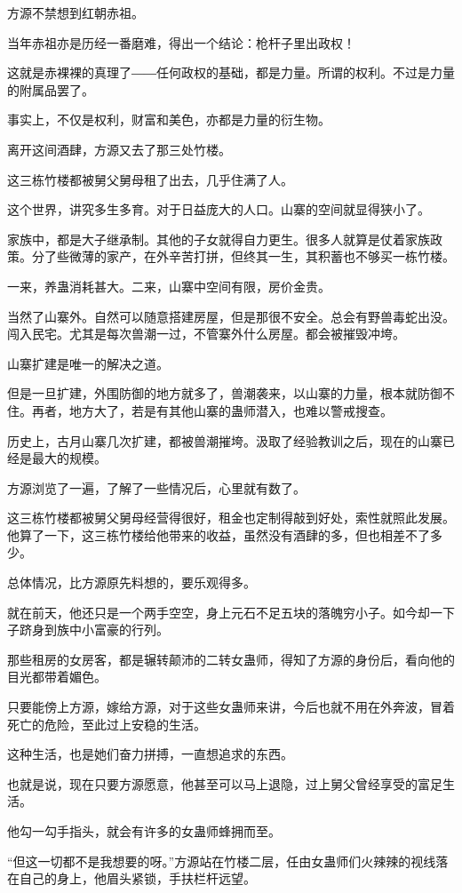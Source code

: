 \begin{this_body}
方源不禁想到红朝赤祖。

当年赤祖亦是历经一番磨难，得出一个结论：枪杆子里出政权！

这就是赤裸裸的真理了――任何政权的基础，都是力量。所谓的权利。不过是力量的附属品罢了。

事实上，不仅是权利，财富和美色，亦都是力量的衍生物。

离开这间酒肆，方源又去了那三处竹楼。

这三栋竹楼都被舅父舅母租了出去，几乎住满了人。

这个世界，讲究多生多育。对于日益庞大的人口。山寨的空间就显得狭小了。

家族中，都是大子继承制。其他的子女就得自力更生。很多人就算是仗着家族政策。分了些微薄的家产，在外辛苦打拼，但终其一生，其积蓄也不够买一栋竹楼。

一来，养蛊消耗甚大。二来，山寨中空间有限，房价金贵。

当然了山寨外。自然可以随意搭建房屋，但是那很不安全。总会有野兽毒蛇出没。闯入民宅。尤其是每次兽潮一过，不管寨外什么房屋。都会被摧毁冲垮。

山寨扩建是唯一的解决之道。

但是一旦扩建，外围防御的地方就多了，兽潮袭来，以山寨的力量，根本就防御不住。再者，地方大了，若是有其他山寨的蛊师潜入，也难以警戒搜查。

历史上，古月山寨几次扩建，都被兽潮摧垮。汲取了经验教训之后，现在的山寨已经是最大的规模。

方源浏览了一遍，了解了一些情况后，心里就有数了。

这三栋竹楼都被舅父舅母经营得很好，租金也定制得敲到好处，索性就照此发展。他算了一下，这三栋竹楼给他带来的收益，虽然没有酒肆的多，但也相差不了多少。

总体情况，比方源原先料想的，要乐观得多。

就在前天，他还只是一个两手空空，身上元石不足五块的落魄穷小子。如今却一下子跻身到族中小富豪的行列。

那些租房的女房客，都是辗转颠沛的二转女蛊师，得知了方源的身份后，看向他的目光都带着媚色。

只要能傍上方源，嫁给方源，对于这些女蛊师来讲，今后也就不用在外奔波，冒着死亡的危险，至此过上安稳的生活。

这种生活，也是她们奋力拼搏，一直想追求的东西。

也就是说，现在只要方源愿意，他甚至可以马上退隐，过上舅父曾经享受的富足生活。

他勾一勾手指头，就会有许多的女蛊师蜂拥而至。

“但这一切都不是我想要的呀。”方源站在竹楼二层，任由女蛊师们火辣辣的视线落在自己的身上，他眉头紧锁，手扶栏杆远望。


\end{this_body}
